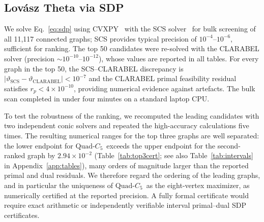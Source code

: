 \documentclass[aps,pra,twocolumn,superscriptaddress,longbibliography,floatfix]{revtex4-2}
\newcommand{\vt}{\vartheta}
\newcommand{\QC}{\ensuremath{\text{Quad-}C_5}}
\begin{document}
\subsection{Lov\'{a}sz Theta via SDP}
\label{sec:method_sdp}

We solve Eq.~\eqref{eq:sdp} using CVXPY~\cite{Diamond2016} with the
SCS solver~\cite{ODonoghue2016} for bulk screening of all 11{,}117
connected graphs; SCS provides typical precision of $10^{-4}$--$10^{-6}$,
sufficient for ranking.
The top 50 candidates were re-solved with the CLARABEL solver
(precision $\sim\!10^{-10}$--$10^{-12}$), whose values are reported
in all tables.
For every graph in the top 50, the SCS--CLARABEL discrepancy is
$|\vt_\text{SCS}-\vt_\text{CLARABEL}|<10^{-7}$ and the CLARABEL primal
feasibility residual satisfies $r_p<4\times10^{-10}$, providing
numerical evidence against artefacts.
The bulk scan completed in under four minutes on a standard laptop CPU.

To test the robustness of the ranking, we recomputed the leading candidates
with two independent conic solvers and repeated the high-accuracy calculations
five times. The resulting numerical ranges for the top three graphs are well
separated: the lower endpoint for \QC\ exceeds the upper endpoint for the
second-ranked graph by $2.94\times10^{-2}$ (Table~\ref{tab:top3cert}; see also Table~\ref{tab:intervals} in Appendix~\ref{app:tables}), many orders of magnitude larger than the reported
primal and dual residuals. We therefore regard the ordering of the leading
graphs, and in particular the uniqueness of \QC\ as the eight-vertex maximizer,
as numerically certified at the reported precision. A fully formal certificate
would require exact arithmetic or independently verifiable interval
primal--dual SDP certificates.
\end{document}
